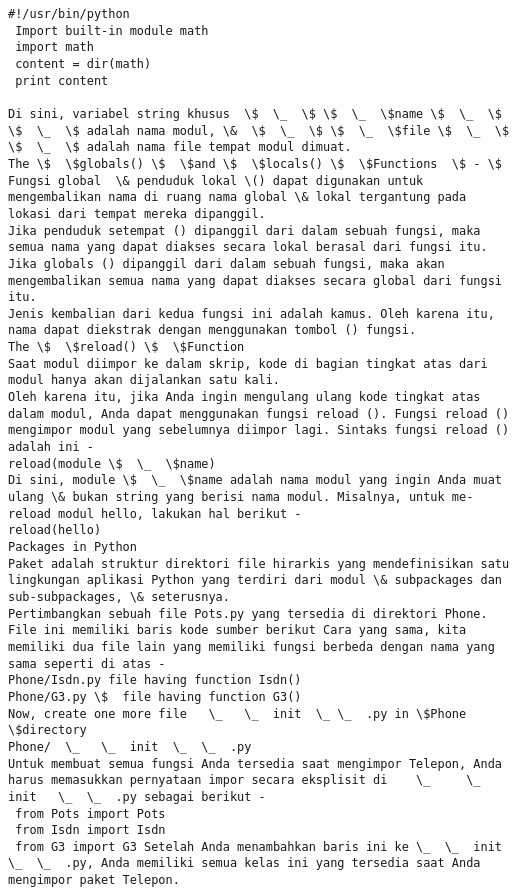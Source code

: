 \begin{verbatim}
#!/usr/bin/python 
 Import built-in module math  
 import math  
 content = dir(math) 
 print content 

Di sini, variabel string khusus  \$  \_  \$ \$  \_  \$name \$  \_  \$ \$  \_  \$ adalah nama modul, \&  \$  \_  \$ \$  \_  \$file \$  \_  \$ \$  \_  \$ adalah nama file tempat modul dimuat. 
The \$  \$globals() \$  \$and \$  \$locals() \$  \$Functions  \$ - \$  
Fungsi global  \& penduduk lokal \() dapat digunakan untuk mengembalikan nama di ruang nama global \& lokal tergantung pada lokasi dari tempat mereka dipanggil.  
Jika penduduk setempat () dipanggil dari dalam sebuah fungsi, maka semua nama yang dapat diakses secara lokal berasal dari fungsi itu. 
Jika globals () dipanggil dari dalam sebuah fungsi, maka akan mengembalikan semua nama yang dapat diakses secara global dari fungsi itu. 
Jenis kembalian dari kedua fungsi ini adalah kamus. Oleh karena itu, nama dapat diekstrak dengan menggunakan tombol () fungsi.
The \$  \$reload() \$  \$Function  
Saat modul diimpor ke dalam skrip, kode di bagian tingkat atas dari modul hanya akan dijalankan satu kali.  
Oleh karena itu, jika Anda ingin mengulang ulang kode tingkat atas dalam modul, Anda dapat menggunakan fungsi reload (). Fungsi reload () mengimpor modul yang sebelumnya diimpor lagi. Sintaks fungsi reload () adalah ini -  
reload(module \$  \_  \$name) 
Di sini, module \$  \_  \$name adalah nama modul yang ingin Anda muat ulang \& bukan string yang berisi nama modul. Misalnya, untuk me-reload modul hello, lakukan hal berikut -  
reload(hello) 
Packages in Python 
Paket adalah struktur direktori file hirarkis yang mendefinisikan satu lingkungan aplikasi Python yang terdiri dari modul \& subpackages dan sub-subpackages, \& seterusnya.  
Pertimbangkan sebuah file Pots.py yang tersedia di direktori Phone. File ini memiliki baris kode sumber berikut Cara yang sama, kita memiliki dua file lain yang memiliki fungsi berbeda dengan nama yang sama seperti di atas -  
Phone/Isdn.py file having function Isdn()  
Phone/G3.py \$  file having function G3() 
Now, create one more file   \_   \_  init  \_ \_  .py in \$Phone  \$directory   
Phone/  \_   \_  init  \_  \_  .py  
Untuk membuat semua fungsi Anda tersedia saat mengimpor Telepon, Anda harus memasukkan pernyataan impor secara eksplisit di    \_     \_  init   \_  \_  .py sebagai berikut - 
 from Pots import Pots 
 from Isdn import Isdn  
 from G3 import G3 Setelah Anda menambahkan baris ini ke \_  \_  init  \_  \_  .py, Anda memiliki semua kelas ini yang tersedia saat Anda mengimpor paket Telepon. 

\end{verbatim}
